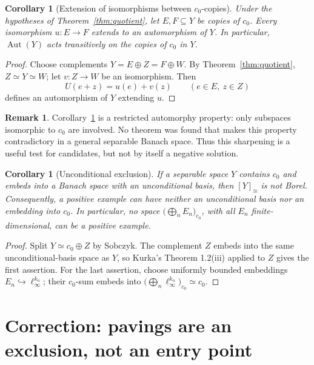 \documentclass[11pt]{article}
\newtheorem{corollary}[theorem]{Corollary}
\theoremstyle{definition}
\newtheorem{remark}[theorem]{Remark}
\newcommand{\czer}{c_0}
\newcommand{\iso}{\simeq}
\newcommand{\class}[1]{[#1]_{\cong}}
\begin{document}
\begin{corollary}[Extension of isomorphisms between \(\czer\)-copies]
\label{cor:automorphy}
Under the hypotheses of Theorem~\ref{thm:quotient}, let
\(E,F\subseteq Y\) be copies of \(\czer\).  Every isomorphism
\(u:E\to F\) extends to an automorphism of \(Y\).  In particular,
\(\operatorname{Aut}(Y)\) acts transitively on the copies of \(\czer\) in
\(Y\).
\end{corollary}

\begin{proof}
Choose complements \(Y=E\oplus Z=F\oplus W\).  By
Theorem~\ref{thm:quotient}, \(Z\iso Y\iso W\); let \(v:Z\to W\) be an
isomorphism.  Then
\[
        U(e+z)=u(e)+v(z) \qquad(e\in E,\ z\in Z)
\]
defines an automorphism of \(Y\) extending \(u\).
\end{proof}

\begin{remark}
Corollary~\ref{cor:automorphy} is a restricted automorphy property: only
subspaces isomorphic to \(\czer\) are involved.  No theorem was found that
makes this property contradictory in a general separable Banach space.  Thus
this sharpening is a useful test for candidates, but not by itself a negative
solution.
\end{remark}

\begin{corollary}[Unconditional exclusion]
If a separable space \(Y\) contains \(\czer\) and embeds into a Banach space
with an unconditional basis, then \(\class{Y}\) is not Borel.  Consequently,
a positive example can have neither an unconditional basis nor an embedding
into \(\czer\).  In particular, no space
\(\bigl(\bigoplus_n E_n\bigr)_{\czer}\), with all \(E_n\) finite-dimensional,
can be a positive example.
\end{corollary}

\begin{proof}
Split \(Y\iso\czer\oplus Z\) by Sobczyk.  The complement \(Z\) embeds into
the same unconditional-basis space as \(Y\), so Kurka's Theorem 1.2(iii)
applied to \(Z\) gives the first assertion.  For the last assertion, choose
uniformly bounded embeddings \(E_n\hookrightarrow\ell_\infty^{k_n}\); their
\(\czer\)-sum embeds into
\(\bigl(\bigoplus_n\ell_\infty^{k_n}\bigr)_{\czer}\iso\czer\).
\end{proof}

\section{Correction: pavings are an exclusion, not an entry point}
\end{document}
